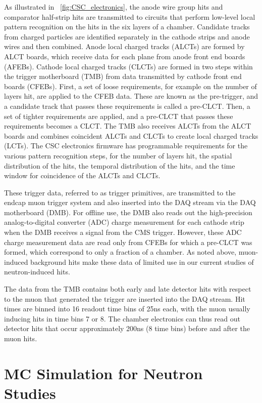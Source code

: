 As illustrated in \FigDot~\ref{fig:CSC_electronics}, the anode wire group hits and comparator half-strip hits are transmitted to circuits that perform low-level local pattern recognition on the hits in the six layers of a chamber. Candidate tracks from charged particles are identified separately in the cathode strips and anode wires and then combined. Anode local charged tracks (ALCTs) are formed by ALCT boards, which receive data for each plane from anode front end boards (AFEBs). Cathode local charged tracks (CLCTs) are formed in two steps within the trigger motherboard (TMB) from data transmitted by cathode front end boards (CFEBs). First, a set of loose requirements, for example on the number of layers hit, are applied to the CFEB data. These are known as the pre-trigger, and a candidate track that passes these requirements is called a pre-CLCT. Then, a set of tighter requirements are applied, and a pre-CLCT that passes these requirements becomes a CLCT. The TMB also receives ALCTs from the ALCT boards and combines coincident ALCTs and CLCTs to create local charged tracks (LCTs). The CSC electronics firmware has programmable requirements for the various pattern recognition steps, \eg for the number of layers hit, the spatial distribution of the hits, the temporal distribution of the hits, and the time window for coincidence of the ALCTs and CLCTs. 

These trigger data, referred to as trigger primitives, are transmitted to the endcap muon trigger system and also inserted into the DAQ stream via the DAQ motherboard (DMB). For offline use, the DMB also reads out the high-precision analog-to-digital converter (ADC) charge measurement for each cathode strip when the DMB receives a signal from the CMS \Lone trigger. However, these ADC charge measurement data are read only from CFEBs for which a pre-CLCT was formed, which correspond to only a fraction of a chamber. As noted above, muon-induced background hits make these data of limited use in our current studies of neutron-induced hits.

The data from the TMB contains both early and late detector hits with respect to the muon that generated the trigger are inserted into the DAQ stream. Hit times are binned into 16 readout time bins of 25\unit{ns} each, with the muon usually inducing hits in time bins 7 or 8. The chamber electronics can thus read out detector hits that occur approximately 200\unit{ns} (8 time bins) before and after the muon hits.

\section{\GEANTfour MC Simulation for Neutron Studies}
\label{sec:G4_neutron_sim}
